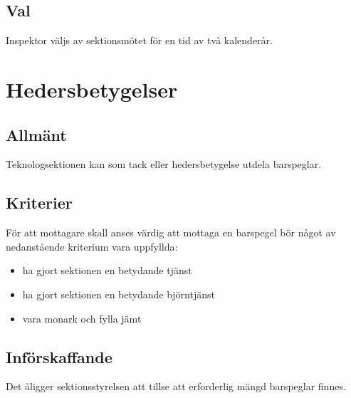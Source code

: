 \documentclass[a4paper, 10pt]{article}
\begin{document}
\subsection{Val}
Inspektor väljs av sektionsmötet för en tid av två kalenderår.
\newpage

\section{Hedersbetygelser}
\subsection{Allmänt}
Teknologsektionen kan som tack eller hedersbetygelse utdela barspeglar.
\subsection{Kriterier}
För att mottagare skall anses värdig att mottaga en barspegel bör något av nedanstående kriterium vara uppfyllda:
\begin{itemize}
\item ha gjort sektionen en betydande tjänst
\item ha gjort sektionen en betydande björntjänst
\item vara monark och fylla jämt
\end{itemize}
\subsection{Införskaffande}
Det åligger sektionsstyrelsen att tillse att erforderlig mängd barspeglar finnes.
\end{document}
